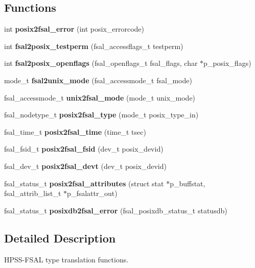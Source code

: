 \subsection*{Functions}
\begin{CompactItemize}
\item 
int {\bf posix2fsal\_\-error} (int posix\_\-errorcode)
\item 
int {\bf fsal2posix\_\-testperm} (fsal\_\-accessflags\_\-t testperm)
\item 
int {\bf fsal2posix\_\-openflags} (fsal\_\-openflags\_\-t fsal\_\-flags, char $\ast$p\_\-posix\_\-flags)
\item 
mode\_\-t {\bf fsal2unix\_\-mode} (fsal\_\-accessmode\_\-t fsal\_\-mode)
\item 
fsal\_\-accessmode\_\-t {\bf unix2fsal\_\-mode} (mode\_\-t unix\_\-mode)
\item 
fsal\_\-nodetype\_\-t {\bf posix2fsal\_\-type} (mode\_\-t posix\_\-type\_\-in)
\item 
fsal\_\-time\_\-t \textbf{posix2fsal\_\-time} (time\_\-t tsec)\label{fsal__convert_8c_605bbbb2ba51449ed78266ad86d2d772}

\item 
fsal\_\-fsid\_\-t \textbf{posix2fsal\_\-fsid} (dev\_\-t posix\_\-devid)\label{fsal__convert_8c_33a5c004f7b33df3dd462d9325305277}

\item 
fsal\_\-dev\_\-t \textbf{posix2fsal\_\-devt} (dev\_\-t posix\_\-devid)\label{fsal__convert_8c_aca862341c53d983d23b597cc082d69d}

\item 
fsal\_\-status\_\-t \textbf{posix2fsal\_\-attributes} (struct stat $\ast$p\_\-buffstat, fsal\_\-attrib\_\-list\_\-t $\ast$p\_\-fsalattr\_\-out)\label{fsal__convert_8c_add7b590c15483d42c8b635e4810f506}

\item 
fsal\_\-status\_\-t {\bf posixdb2fsal\_\-error} (fsal\_\-posixdb\_\-status\_\-t statusdb)
\end{CompactItemize}


\subsection{Detailed Description}
HPSS-FSAL type translation functions. 

